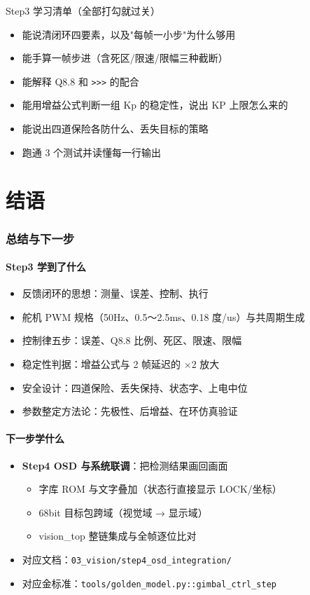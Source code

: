 \documentclass[11pt]{ctexart}
\newcommand{\code}[1]{\texttt{#1}}
\begin{document}
\begin{okbox}{Step3 学习清单（全部打勾就过关）}
\begin{itemize}
  \item 能说清闭环四要素，以及"每帧一小步"为什么够用
  \item 能手算一帧步进（含死区/限速/限幅三种截断）
  \item 能解释 Q8.8 和 \code{>>>} 的配合
  \item 能用增益公式判断一组 Kp 的稳定性，说出 KP 上限怎么来的
  \item 能说出四道保险各防什么、丢失目标的策略
  \item 跑通 3 个测试并读懂每一行输出
\end{itemize}
\end{okbox}



\part*{结语}
\clearpage
\section*{总结与下一步}

\subsection*{Step3 学到了什么}
\begin{itemize}
  \item 反馈闭环的思想：测量、误差、控制、执行
  \item 舵机 PWM 规格（50Hz、0.5～2.5ms、0.18 度/us）与共周期生成
  \item 控制律五步：误差、Q8.8 比例、死区、限速、限幅
  \item 稳定性判据：增益公式与 2 帧延迟的 ×2 放大
  \item 安全设计：四道保险、丢失保持、状态字、上电中位
  \item 参数整定方法论：先极性、后增益、在环仿真验证
\end{itemize}

\subsection*{下一步学什么}
\begin{itemize}
  \item \textbf{Step4 OSD 与系统联调}：把检测结果画回画面
  \begin{itemize}
    \item 字库 ROM 与文字叠加（状态行直接显示 LOCK/坐标）
    \item 68bit 目标包跨域（视觉域 → 显示域）
    \item vision\_top 整链集成与全帧逐位比对
  \end{itemize}
  \item 对应文档：\code{03\_vision/step4\_osd\_integration/}
  \item 对应金标准：\code{tools/golden\_model.py::gimbal\_ctrl\_step}
\end{itemize}
\end{document}
